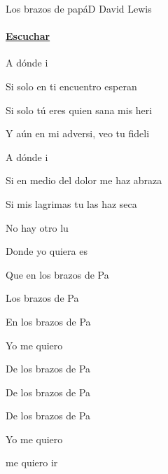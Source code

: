 \documentclass[12pt, spanish]{book}
\begin{document}
    \begin{song}{Los brazos de papá}{D}
    {} %
    {David Lewis}
    {} %
    {}
        \ifChordBk
        \paragraph{\mbox{}\hfill\protect\href{https://open.spotify.com/intl-es/track/6bGqxPSI0EwCcKAGa4x6UR}{Escuchar}\mbox{}\hfill}
        \fi

        \begin{SBOpGroup}
            A dónde i

            Si solo en ti encuentro esperan

            Si solo tú eres quien sana mis heri

            Y aún en mi adversi, veo tu fideli
        \end{SBOpGroup}

        \begin{SBOpGroup}
            A dónde i

            Si en medio del dolor me haz abraza

            Si mis lagrimas tu las haz seca

            No hay otro lu

            Donde yo quiera es
        \end{SBOpGroup}

        \begin{SBChorus}
            Que en los brazos de Pa

            Los brazos de Pa

            En los brazos de Pa

            Yo  me quiero 

            De los brazos de Pa

            De los brazos de Pa

            De los brazos de Pa

            Yo  me quiero 
        \end{SBChorus}


        \begin{SBOpGroup}
             me quiero ir


\end{SBOpGroup}
\end{song}
\end{document}
